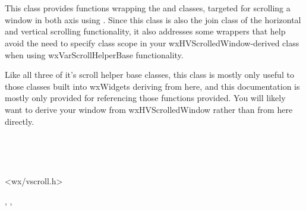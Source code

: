 
\section{}\label{wxvarhvscrollhelper}

This class provides functions wrapping the 
 and
 classes, targeted for
scrolling a window in both axis using
. Since this class is also
the join class of the horizontal and vertical scrolling functionality, it
also addresses some wrappers that help avoid the need to specify class scope
in your wxHVScrolledWindow-derived class when using wxVarScrollHelperBase
functionality.

Like all three of it's scroll helper base classes, this class is mostly only
useful to those classes built into wxWidgets deriving from here, and this
documentation is mostly only provided for referencing those functions
provided. You will likely want to derive your window from wxHVScrolledWindow
rather than from here directly.


\\

\\


<wx/vscroll.h>




,
\rtfsp{},
\rtfsp{}

